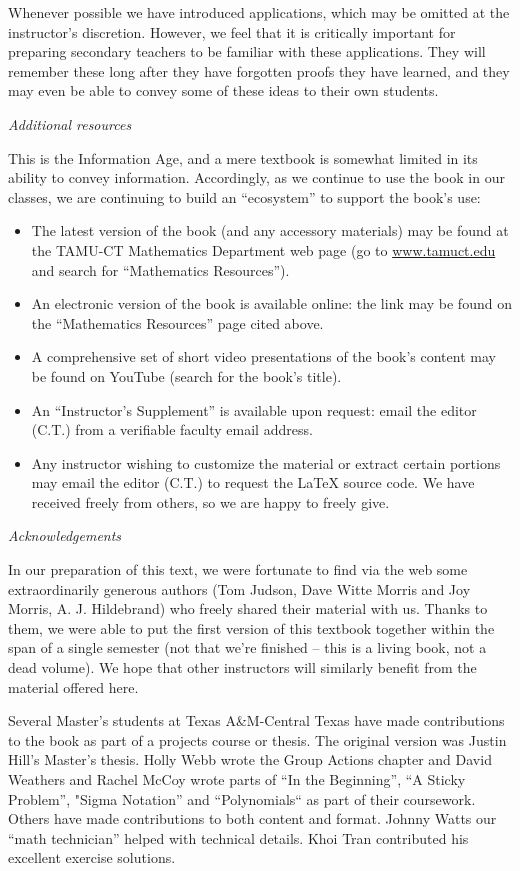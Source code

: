 Whenever possible we have introduced applications, which may be omitted at the instructor's discretion. However, we feel that it is critically important for preparing secondary teachers to be familiar with these applications. They will remember these long after they have forgotten proofs they have learned, and they may even be able to convey some of these ideas to their own students. 

\noindent
\emph{Additional resources}
\smallskip

This is the Information Age, and a mere textbook is somewhat limited in its ability to convey information.  Accordingly, as we continue to use the book in our classes, we are continuing to build an ``ecosystem''  to support the book's use:
\begin{itemize}
\item
The latest version of the book (and any accessory materials) may be found at the TAMU-CT Mathematics Department web page (go to 
\url{www.tamuct.edu} and search for ``Mathematics Resources'').
\item
An electronic version of the book is available online: the link may be found on the ``Mathematics Resources'' page cited above.
\item
 A comprehensive set of short video presentations of the book's content may be found on YouTube (search for the book's title). 
\item
An ``Instructor's Supplement'' is available upon request: email the editor (C.T.) from a verifiable faculty email address.
\item
Any instructor wishing to customize the material or extract certain portions may email the editor (C.T.)  to request the LaTeX source code. We have received freely from others, so we are happy to freely give.
\end{itemize}


\medskip

\noindent
\emph{Acknowledgements}
\smallskip

In our preparation of this text, we were fortunate to find via the web  some extraordinarily generous authors (Tom Judson, Dave Witte Morris and Joy Morris, A. J. Hildebrand) who freely shared their material with us. Thanks to them, we were able to put the first version of this  textbook together within the span of a single semester (not that we're finished -- this is a living book, not a dead volume). We hope that other instructors will similarly benefit from the material offered here.  

Several Master's students at Texas A\&M-Central Texas have made contributions to the book as part of a projects course or thesis. The original version was Justin Hill's Master's thesis. Holly Webb wrote the Group Actions chapter and David Weathers and Rachel McCoy wrote parts of ``In the Beginning'', ``A Sticky Problem'', "Sigma Notation'' and ``Polynomials``  as part of their coursework. Others have made contributions to both content and format. Johnny Watts our ``math technician'' helped with technical details. Khoi Tran contributed his excellent exercise solutions. 

